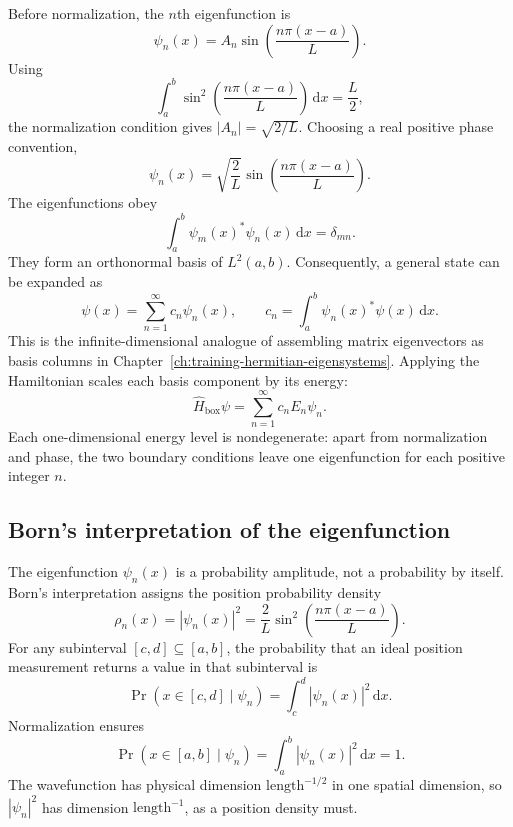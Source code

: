Before normalization, the \(n\)th eigenfunction is
\begin{equation}
  \psi_n(x)
  =A_n\sin\!\left(\frac{n\pi(x-a)}{L}\right).
\end{equation}
Using
\begin{equation}
  \int_a^b
  \sin^2\!\left(\frac{n\pi(x-a)}{L}\right)\,\mathrm{d}x
  =\frac{L}{2},
\end{equation}
the normalization condition gives \(|A_n|=\sqrt{2/L}\). Choosing a real
positive phase convention,
\begin{equation}
  \psi_n(x)
  =\sqrt{\frac{2}{L}}
   \sin\!\left(\frac{n\pi(x-a)}{L}\right).
\end{equation}
The eigenfunctions obey
\begin{equation}
  \int_a^b\psi_m(x)^*\psi_n(x)\,\mathrm{d}x=\delta_{mn}.
\end{equation}
They form an orthonormal basis of \(L^2(a,b)\). Consequently, a general state
can be expanded as
\begin{equation}
  \psi(x)=\sum_{n=1}^{\infty}c_n\psi_n(x),
  \qquad
  c_n=\int_a^b\psi_n(x)^*\psi(x)\,\mathrm{d}x.
\end{equation}
This is the infinite-dimensional analogue of assembling matrix eigenvectors as
basis columns in Chapter~\ref{ch:training-hermitian-eigensystems}. Applying the
Hamiltonian scales each basis component by its energy:
\begin{equation}
  \hat H_{\mathrm{box}}\psi
  =\sum_{n=1}^{\infty}c_nE_n\psi_n.
\end{equation}
Each one-dimensional energy level is nondegenerate: apart from normalization
and phase, the two boundary conditions leave one eigenfunction for each
positive integer \(n\).

\subsection{Born's interpretation of the eigenfunction}

The eigenfunction \(\psi_n(x)\) is a probability amplitude, not a probability
by itself. Born's interpretation assigns the position probability density
\begin{equation}
  \rho_n(x)
  =|\psi_n(x)|^2
  =\frac{2}{L}
   \sin^2\!\left(\frac{n\pi(x-a)}{L}\right).
\end{equation}
For any subinterval \([c,d]\subseteq[a,b]\), the probability that an ideal
position measurement returns a value in that subinterval is
\begin{equation}
  \Pr\!\left(x\in[c,d]\mid\psi_n\right)
  =\int_c^d|\psi_n(x)|^2\,\mathrm{d}x.
\end{equation}
Normalization ensures
\begin{equation}
  \Pr\!\left(x\in[a,b]\mid\psi_n\right)
  =\int_a^b|\psi_n(x)|^2\,\mathrm{d}x
  =1.
\end{equation}
The wavefunction has physical dimension \(\text{length}^{-1/2}\) in one
spatial dimension, so \(|\psi_n|^2\) has dimension
\(\text{length}^{-1}\), as a position density must.

